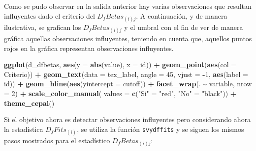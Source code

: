 \documentclass[
  spanish,
  12pt,
]{book}
\newenvironment{Shaded}{\begin{snugshade}}{\end{snugshade}}
\newcommand{\AttributeTok}[1]{\textcolor[rgb]{0.13,0.29,0.53}{#1}}
\newcommand{\DecValTok}[1]{\textcolor[rgb]{0.00,0.00,0.81}{#1}}
\newcommand{\FunctionTok}[1]{\textcolor[rgb]{0.13,0.29,0.53}{\textbf{#1}}}
\newcommand{\NormalTok}[1]{#1}
\newcommand{\OtherTok}[1]{\textcolor[rgb]{0.56,0.35,0.01}{#1}}
\newcommand{\SpecialCharTok}[1]{\textcolor[rgb]{0.81,0.36,0.00}{\textbf{#1}}}
\newcommand{\StringTok}[1]{\textcolor[rgb]{0.31,0.60,0.02}{#1}}
\begin{document}
Como se pudo observar en la salida anterior hay varias observaciones que resultan influyentes dado el criterio del \(D_{f}Betas_{\left(i\right)j}\). A continuación, y de manera ilustrativa, se grafican los \(D_{f}Betas_{\left(i\right)j}\) y el umbral con el fin de ver de manera gráfica aquellas observaciones influyentes, teniendo en cuenta que, aquellos puntos rojos en la gráfica representan observaciones influyentes.

\begin{Shaded}
\begin{Highlighting}[]
\FunctionTok{ggplot}\NormalTok{(d\_dfbetas, }\FunctionTok{aes}\NormalTok{(}\AttributeTok{y =} \FunctionTok{abs}\NormalTok{(value), }\AttributeTok{x =}\NormalTok{ id)) }\SpecialCharTok{+}
  \FunctionTok{geom\_point}\NormalTok{(}\FunctionTok{aes}\NormalTok{(}\AttributeTok{col =}\NormalTok{ Criterio)) }\SpecialCharTok{+}
  \FunctionTok{geom\_text}\NormalTok{(}\AttributeTok{data =}\NormalTok{ tex\_label,}
            \AttributeTok{angle =} \DecValTok{45}\NormalTok{,}
            \AttributeTok{vjust =} \SpecialCharTok{{-}}\DecValTok{1}\NormalTok{,}
            \FunctionTok{aes}\NormalTok{(}\AttributeTok{label =}\NormalTok{ id)) }\SpecialCharTok{+}
  \FunctionTok{geom\_hline}\NormalTok{(}\FunctionTok{aes}\NormalTok{(}\AttributeTok{yintercept =}\NormalTok{ cutoff)) }\SpecialCharTok{+}
  \FunctionTok{facet\_wrap}\NormalTok{(. }\SpecialCharTok{\textasciitilde{}}\NormalTok{ variable, }\AttributeTok{nrow =} \DecValTok{2}\NormalTok{) }\SpecialCharTok{+}
  \FunctionTok{scale\_color\_manual}\NormalTok{(}
    \AttributeTok{values =} \FunctionTok{c}\NormalTok{(}\StringTok{"Si"} \OtherTok{=} \StringTok{"red"}\NormalTok{, }\StringTok{"No"} \OtherTok{=} \StringTok{"black"}\NormalTok{)) }\SpecialCharTok{+}
  \FunctionTok{theme\_cepal}\NormalTok{()}
\end{Highlighting}
\end{Shaded}

Si el objetivo ahora es detectar observaciones influyentes pero considerando ahora la estadística \(D_{f}Fits_{\left(i\right)}\), se utiliza la función \texttt{svydffits} y se siguen los mismos pasos mostrados para el estadístico \(D_{f}Betas_{\left(i\right)j}\):
\end{document}
